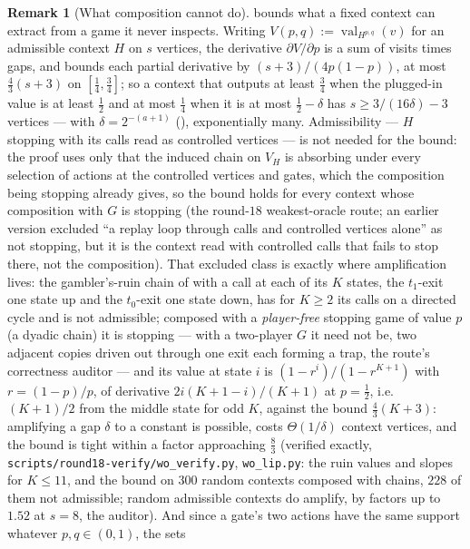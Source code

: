 \documentclass[11pt]{article}
\theoremstyle{plain}
\theoremstyle{definition}
\newtheorem{remark}[theorem]{Remark}
\DeclareMathOperator{\val}{val}
\begin{document}
\begin{remark}[What composition cannot do]\label{rem:no-amplification}
 bounds what a fixed context can extract from a game it
never inspects. Writing $V(p,q):=\val_{H^{p,q}}(v)$ for an admissible
context $H$ on $s$ vertices, the derivative
$\partial V/\partial p$ is a sum of visits times gaps, and
 bounds each partial derivative by $(s+3)/(4p(1-p))$,
at most $\tfrac43(s+3)$ on $[\tfrac14,\tfrac34]$; so a context that
outputs at least $\tfrac34$ when the plugged-in value is at least
$\tfrac12$ and at most $\tfrac14$ when it is at most $\tfrac12-\delta$
has $s\ge3/(16\delta)-3$ vertices --- with $\delta=2^{-(a+1)}$
(), exponentially many. Admissibility ---
$H$ stopping with its calls read as controlled vertices --- is not needed
for the bound: the proof uses only that the induced chain on $V_H$ is
absorbing under every selection of actions at the controlled vertices and
gates, which the composition being stopping already gives, so the bound
holds for every context whose composition with $G$ is stopping (the
round-$18$ weakest-oracle route; an earlier version excluded ``a replay
loop through calls and controlled vertices alone'' as not stopping, but
it is the context read with controlled calls that fails to stop there,
not the composition). That excluded class is exactly where amplification
lives: the gambler's-ruin chain of  with a call at each
of its $K$ states, the $t_1$-exit one state up and the $t_0$-exit one
state down, has for $K\ge2$ its calls on a directed cycle and is not
admissible; composed with a \emph{player-free} stopping game of value $p$
(a dyadic chain) it is stopping --- with a two-player $G$ it need not be,
two adjacent copies driven out through one exit each forming a trap, the
route's correctness auditor --- and its value at state $i$ is
$(1-r^{i})/(1-r^{K+1})$ with $r=(1-p)/p$, of derivative
$2i(K+1-i)/(K+1)$ at $p=\tfrac12$, i.e.\ $(K+1)/2$ from the middle state
for odd $K$, against the bound $\tfrac43(K+3)$: amplifying a gap $\delta$
to a constant is possible, costs $\Theta(1/\delta)$ context vertices, and
the bound is tight within a factor approaching $\tfrac83$ (verified
exactly, \texttt{scripts/round18-verify/wo\_verify.py},
\texttt{wo\_lip.py}: the ruin values and slopes for $K\le11$, and the bound
on $300$ random contexts composed with chains, $228$ of them not
admissible; random admissible contexts do amplify, by factors up to
$1.52$ at $s=8$, the auditor). And since a gate's two
actions have the same support whatever $p,q\in(0,1)$, the sets

\end{remark}
\end{document}
